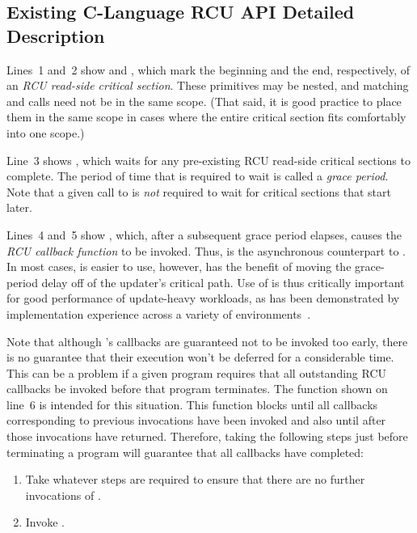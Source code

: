 \documentclass[letterpaper,10pt]{article}
\begin{document}
\subsection{Existing C-Language RCU API Detailed Description}
\label{sec:Existing C-Language RCU API Detailed Description}

Lines~1 and~2 show  and ,
which mark the beginning and the end, respectively, of an \emph{RCU read-side
critical section}.
These primitives may be nested, and matching 
and  calls need not be in the same scope.
(That said, it is good practice to place them in the same scope
in cases where the entire critical section fits comfortably into
one scope.)

Line~3 shows , which waits for any pre-existing
RCU read-side critical sections to complete.
The period of time that  is required to wait is
called a \emph{grace period}.
Note that a given call to  is \emph{not} required to
wait for critical sections that start later.

Lines~4 and~5 show , which, after a subsequent grace period
elapses, causes the  \emph{RCU callback function} to be invoked.
Thus,  is the asynchronous counterpart to
.
In most cases,  is easier to use, however, 
has the benefit of moving the grace-period delay off of the updater's
critical path.
Use of  is thus critically important for good performance of
update-heavy workloads, as has been demonstrated by implementation experience
across a variety of environments~\cite{PaulEMcKenney2015ReadMostly}.

Note that although 's callbacks are guaranteed not to be
invoked too early, there is no guarantee that their execution won't be
deferred for a considerable time.
This can be a problem if a given program requires that all outstanding
RCU callbacks be invoked before that program terminates.
The  function shown on line~6 is intended for this
situation.
This function blocks until all callbacks corresponding to previous
 invocations have been invoked and also until after
those invocations have returned.
Therefore, taking the following steps just before terminating a program
will guarantee that all callbacks have completed:

\begin{enumerate}
\item	Take whatever steps are required to ensure that there are no
	further invocations of .
\item	Invoke .
\end{enumerate}
\end{document}
